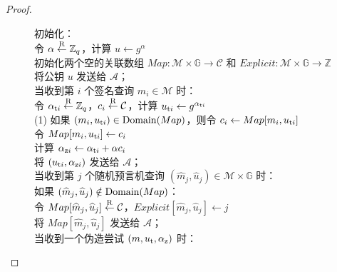 \begin{proof}
\begin{figure}
  \hspace*{45pt} 初始化：\\
  \hspace*{70pt} 令 $\alpha\overset{\rm R}\leftarrow\mathbb{Z}_q$，计算 $u\leftarrow g^\alpha$\\
  \hspace*{70pt} 初始化两个空的关联数组 $Map:\mathcal{M}\times\mathbb{G}\to\mathcal{C}$ 和 $Explicit:\mathcal{M}\times\mathbb{G}\to\mathbb{Z}$\\
  \hspace*{70pt} 将公钥 $u$ 发送给 $\mathcal{A}$；\\
  \hspace*{45pt} 当收到第 $i$ 个签名查询 $m_i\in\mathcal{M}$ 时：\\
  \hspace*{70pt} 令 $\alpha_{{\rm t}i}\overset{\rm R}\leftarrow\mathbb{Z}_q$，$c_i\overset{\rm R}\leftarrow\mathcal{C}$，计算 $u_{{\rm t}i}\leftarrow g^{\alpha_{{\rm t}i}}$\\
  \hspace*{30pt} (1)
  \hspace*{43pt} 如果 $(m_i,u_{{\rm t}i})\in{\rm Domain}(Map)$，则令 $c_i\leftarrow Map[m_i,u_{{\rm t}i}]$\\
  \hspace*{70pt} 令 $Map[m_i,u_{{\rm t}i}]\leftarrow c_i$\\
  \hspace*{70pt} 计算 $\alpha_{{\rm z}i}\leftarrow\alpha_{{\rm t}i}+\alpha c_i$\\
  \hspace*{70pt} 将 $(u_{{\rm t}i},\alpha_{{\rm z}i})$ 发送给 $\mathcal{A}$；\\
  \hspace*{45pt} 当收到第 $j$ 个随机预言机查询 $(\hat m_j,\hat u_j)\in\mathcal{M}\times\mathbb{G}$ 时：\\
  \hspace*{70pt} 如果 $(\widehat m_j,\widehat u_j)\notin{\rm Domain}(Map)$：\\
  \hspace*{95pt} 令 $Map[\widehat m_j,\widehat u_j]\overset{\rm R}\leftarrow\mathcal{C}$，$Explicit[\widehat m_j,\widehat u_j]\leftarrow j$\\
  \hspace*{70pt} 将 $Map[\hat m_j,\hat u_j]$ 发送给 $\mathcal{A}$；\\
  \hspace*{45pt} 当收到一个伪造尝试 $(m,u_{\rm t},\alpha_{\rm z})$ 时：\\

\end{figure}
\end{proof}
